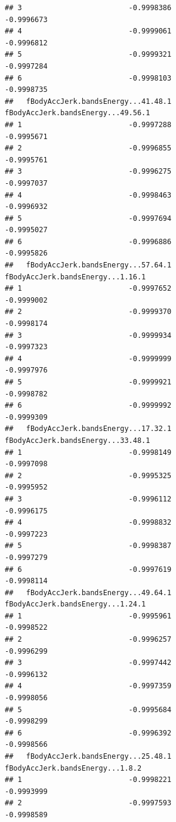 \documentclass[
]{article}
\begin{document}
\begin{verbatim}
## 3                         -0.9998386                         -0.9996673
## 4                         -0.9999061                         -0.9996812
## 5                         -0.9999321                         -0.9997284
## 6                         -0.9998103                         -0.9998735
##   fBodyAccJerk.bandsEnergy...41.48.1 fBodyAccJerk.bandsEnergy...49.56.1
## 1                         -0.9997288                         -0.9995671
## 2                         -0.9996855                         -0.9995761
## 3                         -0.9996275                         -0.9997037
## 4                         -0.9998463                         -0.9996932
## 5                         -0.9997694                         -0.9995027
## 6                         -0.9996886                         -0.9995826
##   fBodyAccJerk.bandsEnergy...57.64.1 fBodyAccJerk.bandsEnergy...1.16.1
## 1                         -0.9997652                        -0.9999002
## 2                         -0.9999370                        -0.9998174
## 3                         -0.9999934                        -0.9997323
## 4                         -0.9999999                        -0.9997976
## 5                         -0.9999921                        -0.9998782
## 6                         -0.9999992                        -0.9999309
##   fBodyAccJerk.bandsEnergy...17.32.1 fBodyAccJerk.bandsEnergy...33.48.1
## 1                         -0.9998149                         -0.9997098
## 2                         -0.9995325                         -0.9995952
## 3                         -0.9996112                         -0.9996175
## 4                         -0.9998832                         -0.9997223
## 5                         -0.9998387                         -0.9997279
## 6                         -0.9997619                         -0.9998114
##   fBodyAccJerk.bandsEnergy...49.64.1 fBodyAccJerk.bandsEnergy...1.24.1
## 1                         -0.9995961                        -0.9998522
## 2                         -0.9996257                        -0.9996299
## 3                         -0.9997442                        -0.9996132
## 4                         -0.9997359                        -0.9998056
## 5                         -0.9995684                        -0.9998299
## 6                         -0.9996392                        -0.9998566
##   fBodyAccJerk.bandsEnergy...25.48.1 fBodyAccJerk.bandsEnergy...1.8.2
## 1                         -0.9998221                       -0.9993999
## 2                         -0.9997593                       -0.9998589

\end{verbatim}
\end{document}
